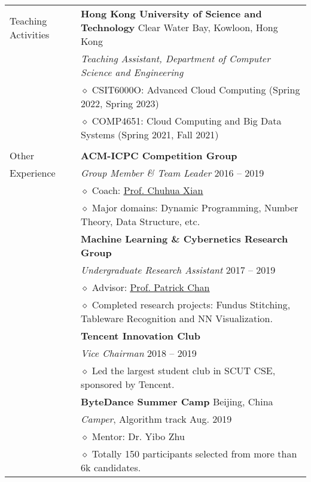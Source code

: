\documentclass[letterpaper, 11pt]{article}
\begin{document}
\begin{longtable}{p{1in}p{5in}}
\nohyphens{Teaching Activities}
& \textbf{Hong Kong University of Science and Technology} \hfill Clear Water Bay, Kowloon, Hong Kong \\
& \textit{Teaching Assistant, Department of Computer Science and Engineering} \\
& $\diamond$ CSIT6000O: Advanced Cloud Computing (Spring 2022, Spring 2023) \\
& $\diamond$ COMP4651: Cloud Computing and Big Data Systems (Spring 2021, Fall 2021) \\
& \\

{Other}
& \textbf{ACM-ICPC Competition Group} \\
{Experience}
& \textit{Group Member \& Team Leader} \hfill 2016 -- 2019 \\
& $\diamond$ Coach: \href{http://chuhuaxian.net/}{\underline{Prof. Chuhua Xian}} \\
& $\diamond$ Major domains: Dynamic Programming, Number Theory, Data Structure, etc. \\

& \textbf{Machine Learning \& Cybernetics Research Group} \\
& \textit{Undergraduate Research Assistant} \hfill 2017 -- 2019 \\
& $\diamond$ Advisor: \href{https://scholar.google.com.hk/citations?user=5SKOC40AAAAJ&hl=en}{\underline{Prof. Patrick Chan}} \\
& $\diamond$ Completed research projects: Fundus Stitching, Tableware Recognition and NN Visualization. \\

& \textbf{Tencent Innovation Club} \\
& \textit{Vice Chairman} \hfill 2018 -- 2019 \\
& $\diamond$ Led the largest student club in SCUT CSE, sponsored by Tencent. \\

& \textbf{ByteDance Summer Camp} \hfill Beijing, China \\
& \textit{Camper}, Algorithm track \hfill Aug. 2019 \\
& $\diamond$ Mentor: Dr. Yibo Zhu \\
& $\diamond$ Totally 150 participants selected from more than 6k candidates. \\


\end{longtable}
\end{document}
